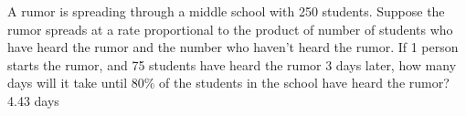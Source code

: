 {
A rumor is spreading through a middle school with 250 students.  Suppose the rumor spreads at a rate proportional to the product of number of students who have heard the rumor and the number who haven't heard the rumor.  If 1 person starts the rumor, and 75 students have heard the rumor 3 days later, how many days will it take until 80\% of the students in the school have heard the rumor?
}
{
4.43 days
}
